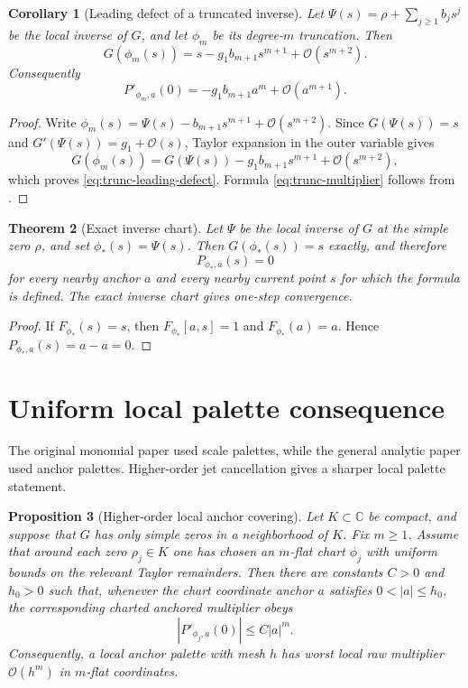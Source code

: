 \documentclass[11pt]{article}
\newtheorem{theorem}{Theorem}[section]
\newtheorem{proposition}[theorem]{Proposition}
\newtheorem{corollary}[theorem]{Corollary}
\theoremstyle{definition}
\newcommand{\C}{\mathbb{C}}
\newcommand{\Oterm}{\mathcal{O}}
\begin{document}
\begin{corollary}[Leading defect of a truncated inverse]\label{cor:trunc-defect}
Let $\Psi(s)=\rho+\sum_{j\geq1}b_js^j$ be the local inverse of $G$, and let $\phi_m$ be its degree-$m$ truncation. Then
\begin{equation}\label{eq:trunc-leading-defect}
G(\phi_m(s))=s-g_1b_{m+1}s^{m+1}+\Oterm(s^{m+2}).
\end{equation}
Consequently
\begin{equation}\label{eq:trunc-multiplier}
P'_{\phi_m,a}(0)=-g_1b_{m+1}a^m+\Oterm(a^{m+1}).
\end{equation}
\end{corollary}

\begin{proof}
Write $\phi_m(s)=\Psi(s)-b_{m+1}s^{m+1}+\Oterm(s^{m+2})$. Since $G(\Psi(s))=s$ and $G'(\Psi(s))=g_1+\Oterm(s)$, Taylor expansion in the outer variable gives
\[
G(\phi_m(s))=G(\Psi(s))-g_1b_{m+1}s^{m+1}+\Oterm(s^{m+2}),
\]
which proves \eqref{eq:trunc-leading-defect}. Formula \eqref{eq:trunc-multiplier} follows from .
\end{proof}

\begin{theorem}[Exact inverse chart]\label{thm:exact-inverse}
Let $\Psi$ be the local inverse of $G$ at the simple zero $\rho$, and set $\phi_*(s)=\Psi(s)$. Then $G(\phi_*(s))=s$ exactly, and therefore
\[
P_{\phi_*,a}(s)=0
\]
for every nearby anchor $a$ and every nearby current point $s$ for which the formula is defined. The exact inverse chart gives one-step convergence.
\end{theorem}

\begin{proof}
If $F_{\phi_*}(s)=s$, then $F_{\phi_*}[a,s]=1$ and $F_{\phi_*}(a)=a$. Hence $P_{\phi_*,a}(s)=a-a=0$.
\end{proof}

\section{Uniform local palette consequence}
The original monomial paper used scale palettes, while the general analytic paper used anchor palettes. Higher-order jet cancellation gives a sharper local palette statement.

\begin{proposition}[Higher-order local anchor covering]\label{prop:palette}
Let $K\subset\C$ be compact, and suppose that $G$ has only simple zeros in a neighborhood of $K$. Fix $m\geq1$. Assume that around each zero $\rho_j\in K$ one has chosen an $m$-flat chart $\phi_j$ with uniform bounds on the relevant Taylor remainders. Then there are constants $C>0$ and $h_0>0$ such that, whenever the chart coordinate anchor $a$ satisfies $0<|a|\leq h_0$, the corresponding charted anchored multiplier obeys
\[
|P'_{\phi_j,a}(0)|\leq C|a|^m.
\]
Consequently, a local anchor palette with mesh $h$ has worst local raw multiplier $\Oterm(h^m)$ in $m$-flat coordinates.
\end{proposition}
\end{document}
